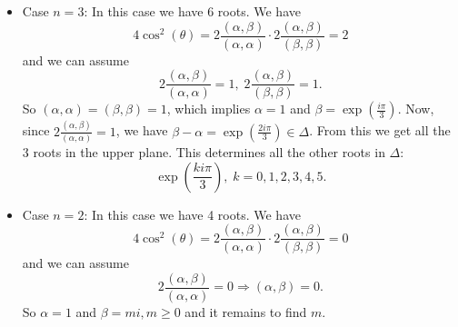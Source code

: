 \begin{itemize}
We have
\begin{equation}
    4\cos^2(\theta)=2\frac{(\alpha,\beta)}{(\alpha,\alpha)}\cdot 2\frac{(\alpha,\beta)}{(\beta,\beta)}=2
\end{equation}
and without lost of generality we assume that 
\begin{equation}
    2\frac{(\alpha,\beta)}{(\alpha,\alpha)}=2,\;2\frac{(\alpha,\beta)}{(\beta,\beta)}=1\Rightarrow 
    \frac{(\beta,\beta)}{(\alpha,\alpha)}=2.
\end{equation}
So we can assume $(\beta,\beta)=2,\;(\alpha,\alpha)=1$, which implies $\alpha=1$ and $\beta=\sqrt{2}\exp(\frac{i\pi}{4})$.
Now, since $2\frac{(\alpha,\beta)}{(\alpha,\alpha)}=2$, we see that $\beta-2\alpha\in\Delta$, i.e., 
$\sqrt{2}\exp(\frac{3i\pi}{4})\in\Delta$. Furthermore $2\frac{(\alpha,\beta)}{(\beta,\beta)}=1$ implies that 
$\alpha-\beta=-i\in\Delta$. Then the four roots in the upper plane are 
\begin{equation}
    1, \sqrt{2}\exp(\frac{i\pi}{4}), i\;\text{ and }\sqrt{2}\exp(\frac{3i\pi}{4}).
\end{equation}
These roots determines all the 8 roots of $\Delta$.

\item Case $n=3$: In this case we have 6 roots. We have 
\begin{equation}
    4\cos^2(\theta)=2\frac{(\alpha,\beta)}{(\alpha,\alpha)}\cdot 2\frac{(\alpha,\beta)}{(\beta,\beta)}=2
\end{equation}
and we can assume 
\begin{equation}
    2\frac{(\alpha,\beta)}{(\alpha,\alpha)}=1,\; 2\frac{(\alpha,\beta)}{(\beta,\beta)}=1.
\end{equation}
So $(\alpha,\alpha)=(\beta,\beta)=1$, which implies $\alpha=1$ and $\beta=\exp(\frac{i\pi}{3})$. Now, since 
$2\frac{(\alpha,\beta)}{(\alpha,\alpha)}=1$, we have $\beta-\alpha=\exp(\frac{2i\pi}{3})\in\Delta$. From this we get 
all the 3 roots in the upper plane. This determines all the other roots in $\Delta$:
\begin{equation}
    \exp(\frac{ki\pi}{3}),\;k=0,1,2,3,4,5.
\end{equation}

\item Case $n=2$: In this case we have 4 roots. We have 
\begin{equation}
    4\cos^2(\theta)=2\frac{(\alpha,\beta)}{(\alpha,\alpha)}\cdot 2\frac{(\alpha,\beta)}{(\beta,\beta)}=0
\end{equation}
and we can assume 
\begin{equation}
    2\frac{(\alpha,\beta)}{(\alpha,\alpha)}=0\Rightarrow (\alpha,\beta)=0.
\end{equation}
So $\alpha=1$ and $\beta = mi,m\geq0$ and it remains to find $m$.


\end{itemize}
